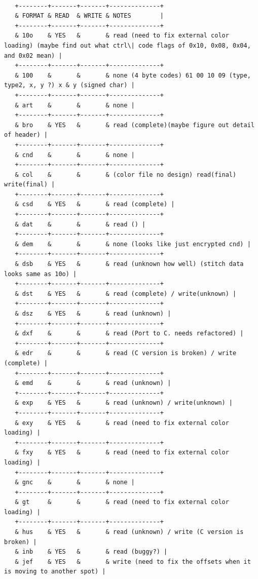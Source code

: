 \documentclass[10pt]{report}
\begin{document}
\begin{verbatim}
   
   +--------+-------+-------+--------------+
   & FORMAT & READ  & WRITE & NOTES        |
   +--------+-------+-------+--------------+
   & 10o    & YES   &       & read (need to fix external color loading) (maybe find out what ctrl\| code flags of 0x10, 0x08, 0x04, and 0x02 mean) |
   +--------+-------+-------+--------------+
   & 100    &       &       & none (4 byte codes) 61 00 10 09 (type, type2, x, y ?) x & y (signed char) |
   +--------+-------+-------+--------------+
   & art    &       &       & none |
   +--------+-------+-------+--------------+
   & bro    & YES   &       & read (complete)(maybe figure out detail of header) |
   +--------+-------+-------+--------------+
   & cnd    &       &       & none |
   +--------+-------+-------+--------------+
   & col    &       &       & (color file no design) read(final) write(final) |
   +--------+-------+-------+--------------+
   & csd    & YES   &       & read (complete) |
   +--------+-------+-------+--------------+
   & dat    &       &       & read () |
   +--------+-------+-------+--------------+
   & dem    &       &       & none (looks like just encrypted cnd) |
   +--------+-------+-------+--------------+
   & dsb    & YES   &       & read (unknown how well) (stitch data looks same as 10o) |
   +--------+-------+-------+--------------+
   & dst    & YES   &       & read (complete) / write(unknown) |
   +--------+-------+-------+--------------+
   & dsz    & YES   &       & read (unknown) |
   +--------+-------+-------+--------------+
   & dxf    &       &       & read (Port to C. needs refactored) |
   +--------+-------+-------+--------------+
   & edr    &       &       & read (C version is broken) / write (complete) |
   +--------+-------+-------+--------------+
   & emd    &       &       & read (unknown) |
   +--------+-------+-------+--------------+
   & exp    & YES   &       & read (unknown) / write(unknown) |
   +--------+-------+-------+--------------+
   & exy    & YES   &       & read (need to fix external color loading) |
   +--------+-------+-------+--------------+
   & fxy    & YES   &       & read (need to fix external color loading) |
   +--------+-------+-------+--------------+
   & gnc    &       &       & none |
   +--------+-------+-------+--------------+
   & gt     &       &       & read (need to fix external color loading) |
   +--------+-------+-------+--------------+
   & hus    & YES   &       & read (unknown) / write (C version is broken) |
   & inb    & YES   &       & read (buggy?) |
   & jef    & YES   &       & write (need to fix the offsets when it is moving to another spot) |

\end{verbatim}
\end{document}
